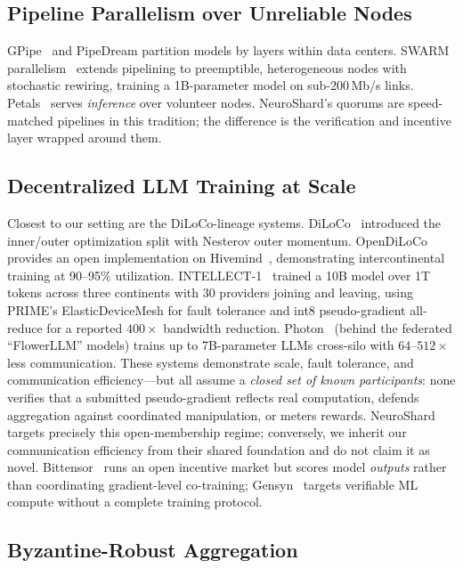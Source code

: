 \documentclass[conference]{IEEEtran}
\begin{document}
\subsection{Pipeline Parallelism over Unreliable Nodes}

GPipe~\cite{huang2019gpipe} and PipeDream partition models by layers within data centers. SWARM parallelism~\cite{ryabinin2023swarm} extends pipelining to preemptible, heterogeneous nodes with stochastic rewiring, training a 1B-parameter model on sub-200\,Mb/s links. Petals~\cite{borzunov2023petals} serves \emph{inference} over volunteer nodes. NeuroShard's quorums are speed-matched pipelines in this tradition; the difference is the verification and incentive layer wrapped around them.

\subsection{Decentralized LLM Training at Scale}
\label{sec:related-decentralized}

Closest to our setting are the DiLoCo-lineage systems. DiLoCo~\cite{douillard2023diloco} introduced the inner/outer optimization split with Nesterov outer momentum. OpenDiLoCo~\cite{jaghouar2024opendiloco} provides an open implementation on Hivemind~\cite{ryabinin2020hivemind}, demonstrating intercontinental training at 90--95\% utilization. INTELLECT-1~\cite{jaghouar2024intellect} trained a 10B model over 1T tokens across three continents with 30 providers joining and leaving, using PRIME's ElasticDeviceMesh for fault tolerance and int8 pseudo-gradient all-reduce for a reported $400\times$ bandwidth reduction. Photon~\cite{sani2024photon} (behind the federated ``FlowerLLM'' models) trains up to 7B-parameter LLMs cross-silo with $64$--$512\times$ less communication. These systems demonstrate scale, fault tolerance, and communication efficiency---but all assume a \emph{closed set of known participants}: none verifies that a submitted pseudo-gradient reflects real computation, defends aggregation against coordinated manipulation, or meters rewards. NeuroShard targets precisely this open-membership regime; conversely, we inherit our communication efficiency from their shared foundation and do not claim it as novel. Bittensor~\cite{bittensor} runs an open incentive market but scores model \emph{outputs} rather than coordinating gradient-level co-training; Gensyn~\cite{gensyn} targets verifiable ML compute without a complete training protocol.

\subsection{Byzantine-Robust Aggregation}
\end{document}
